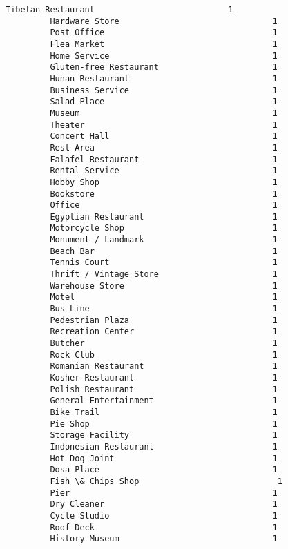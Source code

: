 \documentclass[11pt]{article}
\begin{document}
\begin{Verbatim}[commandchars=\\\{\}]
         Tibetan Restaurant                           1
         Hardware Store                               1
         Post Office                                  1
         Flea Market                                  1
         Home Service                                 1
         Gluten-free Restaurant                       1
         Hunan Restaurant                             1
         Business Service                             1
         Salad Place                                  1
         Museum                                       1
         Theater                                      1
         Concert Hall                                 1
         Rest Area                                    1
         Falafel Restaurant                           1
         Rental Service                               1
         Hobby Shop                                   1
         Bookstore                                    1
         Office                                       1
         Egyptian Restaurant                          1
         Motorcycle Shop                              1
         Monument / Landmark                          1
         Beach Bar                                    1
         Tennis Court                                 1
         Thrift / Vintage Store                       1
         Warehouse Store                              1
         Motel                                        1
         Bus Line                                     1
         Pedestrian Plaza                             1
         Recreation Center                            1
         Butcher                                      1
         Rock Club                                    1
         Romanian Restaurant                          1
         Kosher Restaurant                            1
         Polish Restaurant                            1
         General Entertainment                        1
         Bike Trail                                   1
         Pie Shop                                     1
         Storage Facility                             1
         Indonesian Restaurant                        1
         Hot Dog Joint                                1
         Dosa Place                                   1
         Fish \& Chips Shop                            1
         Pier                                         1
         Dry Cleaner                                  1
         Cycle Studio                                 1
         Roof Deck                                    1
         History Museum                               1

\end{Verbatim}
\end{document}
